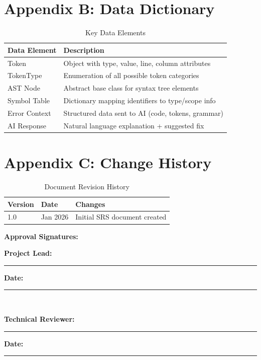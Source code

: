 \documentclass[a4paper,11pt]{article}
\begin{document}
\section{Appendix B: Data Dictionary}

\begin{table}[H]
\centering
\begin{tabularx}{\textwidth}{|l|X|}
\hline
\rowcolor{blue!10}
\textbf{Data Element} & \textbf{Description} \\
\hline
Token & Object with type, value, line, column attributes \\
\hline
TokenType & Enumeration of all possible token categories \\
\hline
AST Node & Abstract base class for syntax tree elements \\
\hline
Symbol Table & Dictionary mapping identifiers to type/scope info \\
\hline
Error Context & Structured data sent to AI (code, tokens, grammar) \\
\hline
AI Response & Natural language explanation + suggested fix \\
\hline
\end{tabularx}
\caption{Key Data Elements}
\end{table}

\section{Appendix C: Change History}

\begin{table}[H]
\centering
\begin{tabularx}{\textwidth}{|l|l|X|}
\hline
\rowcolor{blue!10}
\textbf{Version} & \textbf{Date} & \textbf{Changes} \\
\hline
1.0 & Jan 2026 & Initial SRS document created \\
\hline
\end{tabularx}
\caption{Document Revision History}
\end{table}

\vspace{10mm}
\noindent\textbf{Approval Signatures:} \\
\vspace{5mm}

\noindent\textbf{Project Lead:} \rule{5cm}{0.4pt} \hspace{1cm} \textbf{Date:} \rule{3cm}{0.4pt} \\
\vspace{5mm}

\noindent\textbf{Technical Reviewer:} \rule{5cm}{0.4pt} \hspace{1cm} \textbf{Date:} \rule{3cm}{0.4pt} \\
\end{document}
